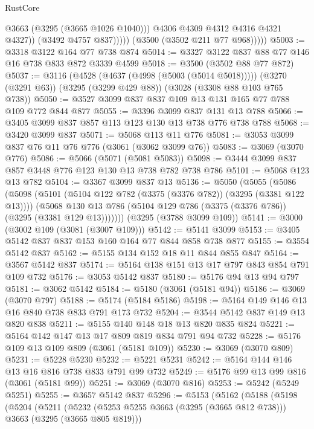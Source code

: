 \begin{lexlean}{RustCore}
\begin{coremodule}
                        @3663
                        (@3295 (@3665 @1026 @1040)))
                      @4306
                      @4309
                      @4312
                      @4316
                      @4321
                      @4327))
                  (@3492 @4757 @837)))))
          (@3500 (@3502 @211 @77 @968)))))
@5003 := @3318 @3122 @164 @77 @738 @874
@5014 := @3327 @3122 @837 @88 @77 @146 @16 @738 @833 @872 @3339 @4599
@5018 := @3500 (@3502 @88 @77 @872)
@5037 := @3116
    (@4528 (@4637 (@4998 (@5003 (@5014 @5018)))))
    (@3270 (@3291 @63))
    (@3295 (@3299 @429 @88))
    (@3028 (@3308 @88 @103 @765 @738))
@5050 := @3527 @3099 @837 @837 @109 @13 @131 @165 @77 @788 @109 @772 @844 @877
@5055 := @3396 @3099 @837 @131 @13 @788
@5066 := @3405 @3099 @837 @857 @113 @123 @130 @13 @738 @776 @738 @788
@5068 := @3420 @3099 @837
@5071 := @5068 @113 @11 @776
@5081 := @3053 @3099 @837 @76 @11 @76 @776 (@3061 (@3062 @3099 @76))
@5083 := @3069 (@3070 @776)
@5086 := @5066 (@5071 (@5081 @5083))
@5098 := @3444 @3099 @837 @857 @3448 @776 @123 @130 @13 @738 @782 @738 @786
@5101 := @5068 @123 @13 @782
@5104 := @3367 @3099 @837 @13
@5136 := @5050
    (@5055
      (@5086
        (@5098
          (@5101 (@5104 @122 @782 (@3375 (@3376 @782)) (@3295 (@3381 @122 @13))))
          (@5068 @130 @13 @786 (@5104 @129 @786 (@3375 (@3376 @786)) (@3295 (@3381 @129 @13)))))))
    (@3295 (@3788 @3099 @109))
@5141 := @3000 (@3002 @109 (@3081 (@3007 @109)))
@5142 := @5141 @3099
@5153 := @3405 @5142 @837 @837 @153 @160 @164 @77 @844 @858 @738 @877
@5155 := @3554 @5142 @837
@5162 := @5155 @134 @152 @18 @11 @844 @855 @847
@5164 := @3567 @5142 @837
@5174 := @5164 @138 @151 @13 @17 @797 @843 @854 @791 @109 @732
@5176 := @3053 @5142 @837
@5180 := @5176 @94 @13 @94 @797
@5181 := @3062 @5142
@5184 := @5180 (@3061 (@5181 @94))
@5186 := @3069 (@3070 @797)
@5188 := @5174 (@5184 @5186)
@5198 := @5164 @149 @146 @13 @16 @840 @738 @833 @791 @173 @732
@5204 := @3544 @5142 @837 @149 @13 @820 @838
@5211 := @5155 @140 @148 @18 @13 @820 @835 @824
@5221 := @5164 @142 @147 @13 @17 @809 @819 @834 @791 @94 @732
@5228 := @5176 @109 @13 @109 @809 (@3061 (@5181 @109))
@5230 := @3069 (@3070 @809)
@5231 := @5228 @5230
@5232 := @5221 @5231
@5242 := @5164 @144 @146 @13 @16 @816 @738 @833 @791 @99 @732
@5249 := @5176 @99 @13 @99 @816 (@3061 (@5181 @99))
@5251 := @3069 (@3070 @816)
@5253 := @5242 (@5249 @5251)
@5255 := @3657 @5142 @837
@5296 := @5153
    (@5162
      (@5188
        (@5198
          (@5204
            (@5211
              (@5232 (@5253 @5255 @3663 (@3295 (@3665 @812 @738))) @3663 (@3295 (@3665 @805 @819)))

\end{coremodule}
\end{lexlean}
